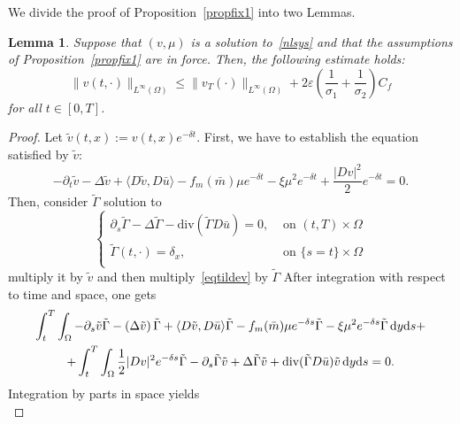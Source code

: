 \documentclass[10pt,a4paper,nouppercase,nowrite]{article}
\numberwithin{equation}{section}
\newcommand{\di}{{\rm d}}
\newcommand{\eps}{\varepsilon}
\newtheorem{lem}[defn]{Lemma}
\theoremstyle{definition}
\begin{document}
	
		We divide the proof of Proposition~\ref{propfix1} into two Lemmas.
	\begin{lem} \label{lemv}
		Suppose that $(v,\mu)$ is a solution to~\eqref{nlsys} and that the assumptions of Proposition~\ref{propfix1} are in force. Then,	the following estimate holds:
		\begin{equation*}
			\|v(t,\cdot)\|_{L^{\infty}(\Omega)} \le \| v_T(\cdot) \|_{L^{\infty}(\Omega)} + 2 \eps \left( \frac{1}{\sigma_1} + \frac{1}{\sigma_2} \right) C_f
		\end{equation*}
		for all $t \in [0,T]$.
	\end{lem}
	\begin{proof}
		Let $\tilde{v}(t,x):=v(t,x)e^{-\delta t}$. First, we have to establish the equation satisfied by $\tilde{v}$:
		\begin{equation}
			- \partial_t \tilde{v} - \Delta \tilde{v} + \langle D\tilde{v},D\bar{u} \rangle - f_m(\bar{m}) \mu e^{-\delta t} -\xi \mu^2 e^{-\delta t} + \frac{|Dv|^2}{2} e^{-\delta t} = 0.
			\label{eqtildev}
		\end{equation}
		Then, consider $\tilde{\Gamma}$ solution to
		\begin{equation*}
			\begin{cases}
				\partial_s \tilde{\Gamma} - \Delta \tilde{\Gamma} - \text{div}(\tilde{\Gamma} D\bar{u}) = 0,& \text{ on } (t,T) \times \Omega \\
				\tilde{\Gamma}(t,\cdot) = \delta_x,& \text{ on } \{ s=t \} \times \Omega \\
			\end{cases}
		\end{equation*}
		multiply it by $\tilde v$ and then multiply~\eqref{eqtildev} by $\tilde{\Gamma}$
		After integration with respect to time and space, one gets
		\begin{multline*}
			\int_t^T \int_{\Omega} - \partial_s \tilde{v} \tilde{\Gamma} - \left( \Delta \tilde{v} \right) \tilde{\Gamma} + \langle D\tilde{v},D\bar{u} \rangle \tilde{\Gamma} - f_m(\bar{m}) \mu e^{-\delta s} \tilde{\Gamma} - \xi \mu^2 e^{-\delta s} \tilde{\Gamma} \, \di y \di s + \\
			+ \int_t^T \int_{\Omega} \frac{1}{2} |Dv|^2 e^{-\delta s} \tilde{\Gamma} - \partial_s \tilde{\Gamma} \tilde{v} + \Delta \tilde{\Gamma} \tilde{v} + \text{div}(\tilde{\Gamma} D\bar{u}) \tilde{v}\, \di y \di s = 0.
		\end{multline*}
		Integration by parts in space yields
		\begin{equation*}

\end{equation*}
\end{proof}
\end{document}
